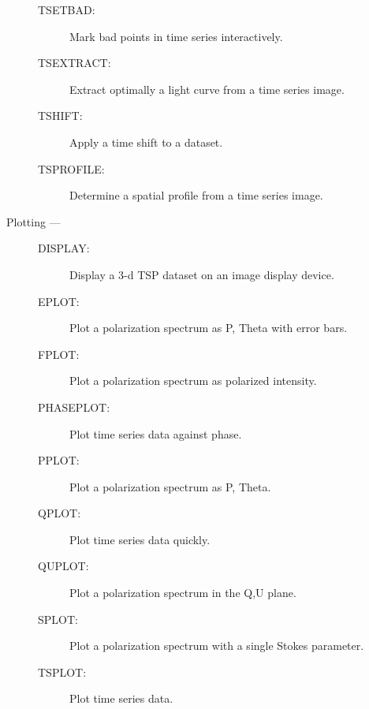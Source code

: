 \begin{description}
\begin{description}
\item [TSETBAD:]  Mark bad points in time series interactively.
\item [TSEXTRACT:]  Extract optimally a light curve from a time series image.
\item [TSHIFT:]  Apply a time shift to a dataset.
\item [TSPROFILE:]  Determine a spatial profile from a time series image.
\end{description}
\item [Plotting ---]
\begin{description}
\item [DISPLAY:]  Display a 3-d TSP dataset on an image display device.
\item [EPLOT:]  Plot a polarization spectrum as P, Theta with error bars.
\item [FPLOT:]  Plot a polarization spectrum as polarized intensity.
\item [PHASEPLOT:]  Plot time series data against phase.
\item [PPLOT:]  Plot a polarization spectrum as P, Theta.
\item [QPLOT:]  Plot time series data quickly.
\item [QUPLOT:]  Plot a polarization spectrum in the Q,U plane.
\item [SPLOT:]  Plot a polarization spectrum with a single Stokes parameter.
\item [TSPLOT:]  Plot time series data.
\end{description}
\end{description}
